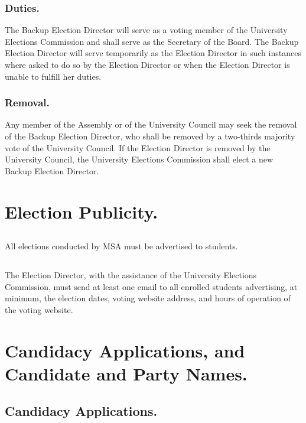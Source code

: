 \subsubsection{Duties.}
\subsubsubsection{}
The Backup Election Director will serve as a voting member of the University Elections Commission and shall serve as the Secretary of the Board.
\subsubsubsection{}
The Backup Election Director will serve temporarily as the Election Director in such instances where asked to do so by the Election Director or when the Election Director is unable to fulfill her duties.
\subsubsection{Removal.}
Any member of the Assembly or of the University Council may seek the removal of the Backup Election Director, who shall be removed by a two-thirds majority vote of the University Council.  If the Election Director is removed by the University Council, the University Elections Commission shall elect a new Backup Election Director.


\section{Election Publicity.}
\subsection{}
All elections conducted by MSA must be advertised to students.
\subsection{}
The Election Director, with the assistance of the University Elections Commission, must send at least one email to all enrolled students advertising, at minimum, the election dates, voting website address, and hours of operation of the voting website.


\section{Candidacy Applications, and Candidate and Party Names.}
\subsection{Candidacy Applications.}
